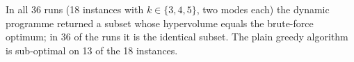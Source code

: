In all 36 runs (18 instances with $k\in\{3,4,5\}$, two modes each) the dynamic programme returned a subset whose hypervolume equals the brute-force optimum; in 36 of the runs it is the identical subset.  The plain greedy algorithm is sub-optimal on 13 of the 18 instances.
